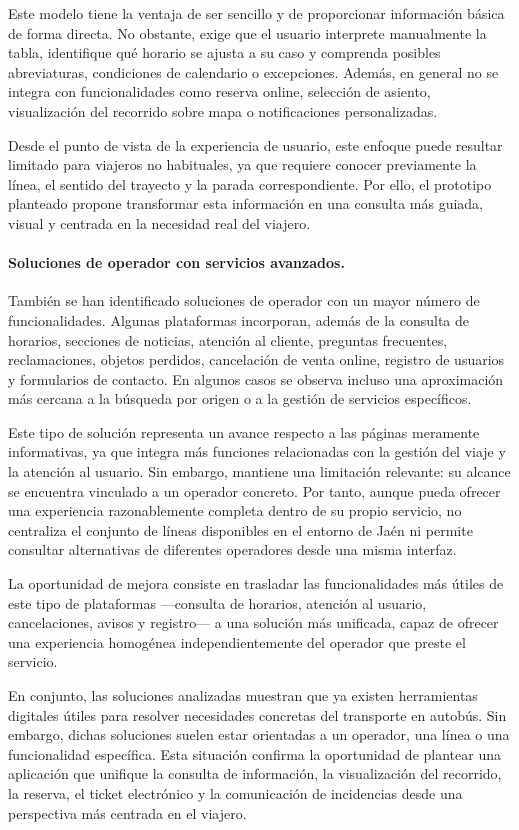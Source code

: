 Este modelo tiene la ventaja de ser sencillo y de proporcionar información básica de forma directa. No obstante, exige que el usuario interprete manualmente la tabla, identifique qué horario se ajusta a su caso y comprenda posibles abreviaturas, condiciones de calendario o excepciones. Además, en general no se integra con funcionalidades como reserva online, selección de asiento, visualización del recorrido sobre mapa o notificaciones personalizadas.

Desde el punto de vista de la experiencia de usuario, este enfoque puede resultar limitado para viajeros no habituales, ya que requiere conocer previamente la línea, el sentido del trayecto y la parada correspondiente. Por ello, el prototipo planteado propone transformar esta información en una consulta más guiada, visual y centrada en la necesidad real del viajero.

\paragraph{Soluciones de operador con servicios avanzados.}
También se han identificado soluciones de operador con un mayor número de funcionalidades. Algunas plataformas incorporan, además de la consulta de horarios, secciones de noticias, atención al cliente, preguntas frecuentes, reclamaciones, objetos perdidos, cancelación de venta online, registro de usuarios y formularios de contacto. En algunos casos se observa incluso una aproximación más cercana a la búsqueda por origen o a la gestión de servicios específicos.

Este tipo de solución representa un avance respecto a las páginas meramente informativas, ya que integra más funciones relacionadas con la gestión del viaje y la atención al usuario. Sin embargo, mantiene una limitación relevante: su alcance se encuentra vinculado a un operador concreto. Por tanto, aunque pueda ofrecer una experiencia razonablemente completa dentro de su propio servicio, no centraliza el conjunto de líneas disponibles en el entorno de Jaén ni permite consultar alternativas de diferentes operadores desde una misma interfaz.

La oportunidad de mejora consiste en trasladar las funcionalidades más útiles de este tipo de plataformas ---consulta de horarios, atención al usuario, cancelaciones, avisos y registro--- a una solución más unificada, capaz de ofrecer una experiencia homogénea independientemente del operador que preste el servicio.

En conjunto, las soluciones analizadas muestran que ya existen herramientas digitales útiles para resolver necesidades concretas del transporte en autobús. Sin embargo, dichas soluciones suelen estar orientadas a un operador, una línea o una funcionalidad específica. Esta situación confirma la oportunidad de plantear una aplicación que unifique la consulta de información, la visualización del recorrido, la reserva, el ticket electrónico y la comunicación de incidencias desde una perspectiva más centrada en el viajero.


